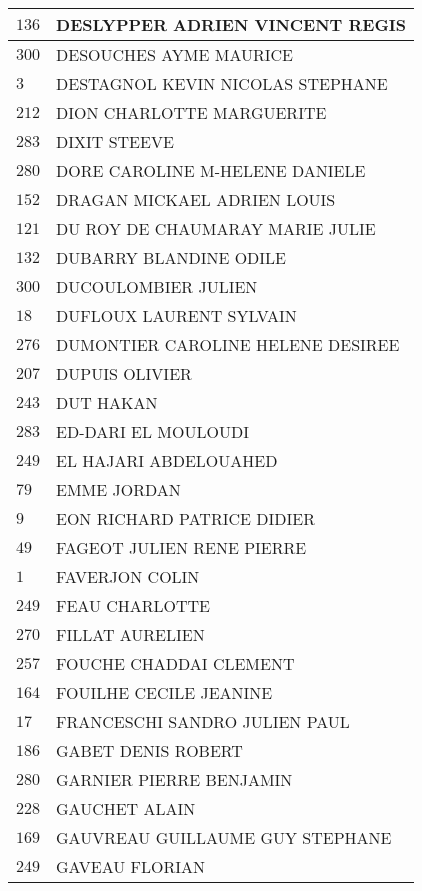 \begin{xltabular}{\linewidth}{|l|X|}
    \hline
    $136$ & DESLYPPER ADRIEN VINCENT REGIS \\
    \hline
    $300$ & DESOUCHES AYME MAURICE \\
    \hline
    $3$ & DESTAGNOL KEVIN NICOLAS STEPHANE \\
    \hline
    $212$ & DION CHARLOTTE MARGUERITE \\
    \hline
    $283$ & DIXIT STEEVE \\
    \hline
    $280$ & DORE CAROLINE M-HELENE DANIELE \\
    \hline
    $152$ & DRAGAN MICKAEL ADRIEN LOUIS \\
    \hline
    $121$ & DU ROY DE CHAUMARAY MARIE JULIE \\
    \hline
    $132$ & DUBARRY BLANDINE ODILE \\
    \hline
    $300$ & DUCOULOMBIER JULIEN \\
    \hline
    $18$ & DUFLOUX LAURENT SYLVAIN \\
    \hline
    $276$ & DUMONTIER CAROLINE HELENE DESIREE \\
    \hline
    $207$ & DUPUIS OLIVIER \\
    \hline
    $243$ & DUT HAKAN \\
    \hline
    $283$ & ED-DARI EL MOULOUDI \\
    \hline
    $249$ & EL HAJARI ABDELOUAHED \\
    \hline
    $79$ & EMME JORDAN \\
    \hline
    $9$ & EON RICHARD PATRICE DIDIER \\
    \hline
    $49$ & FAGEOT JULIEN RENE PIERRE \\
    \hline
    $1$ & FAVERJON COLIN \\
    \hline
    $249$ & FEAU CHARLOTTE \\
    \hline
    $270$ & FILLAT AURELIEN \\
    \hline
    $257$ & FOUCHE CHADDAI CLEMENT \\
    \hline
    $164$ & FOUILHE CECILE JEANINE \\
    \hline
    $17$ & FRANCESCHI SANDRO JULIEN PAUL \\
    \hline
    $186$ & GABET DENIS ROBERT \\
    \hline
    $280$ & GARNIER PIERRE BENJAMIN \\
    \hline
    $228$ & GAUCHET ALAIN \\
    \hline
    $169$ & GAUVREAU GUILLAUME GUY STEPHANE \\
    \hline
    $249$ & GAVEAU FLORIAN \\

\end{xltabular}
